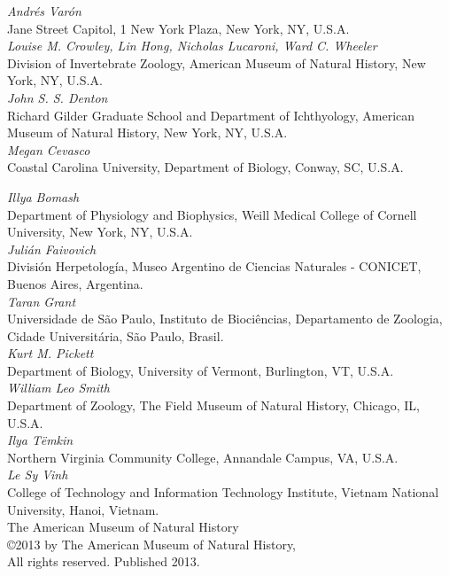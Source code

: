 \documentclass[11pt]{book}
\begin{document}
\begin{flushleft}
    \small
{\it
Andr\'es Var\'on}\\
Jane Street Capitol, 1 New York Plaza, New York, NY, U.S.A. \\
\smallskip 
{\it
Louise M. Crowley, Lin Hong, Nicholas Lucaroni, Ward C. Wheeler \\
}
Division of Invertebrate Zoology, American Museum of Natural History, New York, NY, U.S.A.\\
\smallskip
{\it
John S. S. Denton\\
}
Richard Gilder Graduate School and Department of Ichthyology, American Museum of Natural History, New York, NY, U.S.A.\\
\smallskip
{\it
Megan Cevasco} \\
Coastal Carolina University, Department of Biology, Conway, SC, U.S.A. \\
\vspace*{0.75cm}

{\it
Illya Bomash}\\
Department of Physiology and Biophysics, Weill Medical College of Cornell University, New York, NY, U.S.A.\\
\smallskip
{\it
Juli\'an Faivovich}\\
Divisi\'on Herpetolog\'ia, Museo Argentino de Ciencias Naturales - CONICET, Buenos Aires, Argentina.\\
\smallskip
{\it
Taran Grant}\\
Universidade de S\~{a}o Paulo, Instituto de Bioci\^{e}ncias, Departamento de Zoologia, Cidade Universit\'aria, 
S\~{a}o Paulo, Brasil.\\
\smallskip
{\it
Kurt M. Pickett}\\
Department of Biology, University of Vermont, Burlington, VT, U.S.A. \\
\smallskip
{\it
William Leo Smith}\\
Department of Zoology, The Field Museum of Natural History, Chicago, IL, U.S.A.\\
\smallskip
{\it
Ilya T\"emkin} \\
Northern Virginia Community College, Annandale Campus, VA, U.S.A. \\
\smallskip
{\it
Le Sy Vinh}\\
College of Technology and Information Technology Institute, Vietnam National University, Hanoi, Vietnam.  \\

\vspace*{0.25cm}
The American Museum of Natural History\\
\copyright  2013 by The American Museum of Natural History, \\
All rights reserved. Published 2013.


\end{flushleft}
\end{document}
